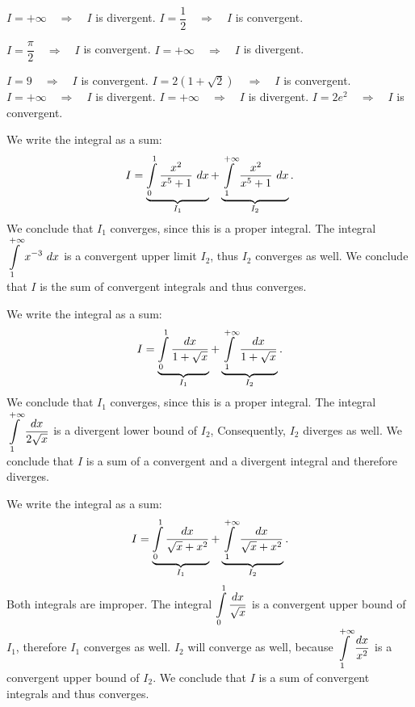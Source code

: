 \begin{Answer}
    
    	\Question $I=+ \infty \quad \Rightarrow  \quad I$ is divergent.
    	\Question $I=\dfrac{1}{2}\quad \Rightarrow  \quad I$ is convergent.
    	
    	\ifcalculus
    	\Question $I=\dfrac{\pi}{2}\quad \Rightarrow  \quad I$ is convergent. %
    	\Question $I=+ \infty \quad \Rightarrow  \quad I$ is divergent. %
    	\fi
    	
    	\Question $I=9 \quad \Rightarrow  \quad I$ is convergent.
    	\Question $I= 2 \left( 1 + \sqrt{2} \right)  \quad \Rightarrow  \quad I$ is convergent.
    	\Question $I=+ \infty \quad \Rightarrow  \quad I$ is divergent.
    	\Question $I=+ \infty \quad \Rightarrow  \quad I$ is divergent.
    	\Question $I= 2 e^{2} \quad \Rightarrow  \quad I$ is convergent.
    	
    	\ifanalysis
    	 \Question We write the integral as a sum:
            \[ I = \underbrace{\ds \int\limits_0^{1} \dfrac{x^2}{x^5+1} \ dx}_{I_1} + \underbrace{\ds \int\limits_1^{+\infty} \dfrac{x^2}{x^5+1} \ dx}_{I_2}. \]
            We conclude that $I_1$ converges, since this is a proper integral. The integral $\displaystyle \int\limits_1^{+\infty} x^{-3} \ dx$ is a convergent upper limit $I_2$, thus $I_2$ converges as well. We conclude that $I$ is the sum of convergent integrals and thus converges.
    
        \Question We write the integral as a sum:
            \[ I = \underbrace{\displaystyle \int\limits_0^{1}  \dfrac{dx}{1+\sqrt{x}}}_{I_1} + \underbrace{\displaystyle \int\limits_1^{+\infty}  \dfrac{dx}{1+\sqrt{x}}}_{I_2}.\]
            We conclude that $I_1$ converges, since this is a proper integral. The integral $\displaystyle \int\limits_1^{+\infty}  \dfrac{dx}{2\sqrt{x}}$ is a divergent lower bound of $I_2$, Consequently, $I_2$ diverges as well. We conclude that $I$ is a sum of a convergent and a divergent integral and therefore diverges.
    
        \Question We write the integral as a sum:
            \[ I = \underbrace{\displaystyle \int\limits_0^{1}  \dfrac{dx}{\sqrt{x}+x^2}}_{I_1} + \underbrace{\displaystyle \int\limits_1^{+\infty}  \dfrac{dx}{\sqrt{x}+x^2}}_{I_2}.\]
            Both integrals are improper. The integral $\displaystyle \int\limits_0^{1}  \dfrac{dx}{\sqrt{x}}$ is a convergent upper bound of $I_1$, therefore $I_1$ converges as well. $I_2$ will converge as well, because $ \displaystyle \int\limits_1^{+\infty}  \dfrac{dx}{x^2}$ is a convergent upper bound of $I_2$. We conclude that $I$ is a sum of convergent integrals and thus converges.
    

\end{Answer}

